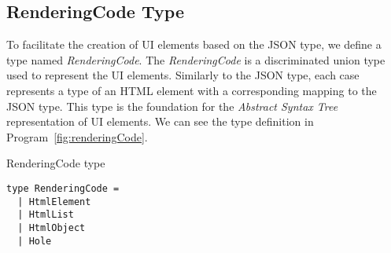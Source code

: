 \subsection{RenderingCode Type}
To facilitate the creation of UI elements based on the JSON type, we define a type named \emph{RenderingCode}.
The \emph{RenderingCode} is a discriminated union type used to represent the UI elements.
Similarly to the JSON type, each case represents a type of an HTML element with a corresponding mapping to the JSON type.
This type is the foundation for the \emph{Abstract Syntax Tree} representation of UI elements.
We can see the type definition in Program~\ref{fig:renderingCode}.
\begin{listing}[htbp]
	\caption {RenderingCode type}
	\label{fig:renderingCode}
	\begin{lstlisting}
type RenderingCode =
  | HtmlElement 
  | HtmlList 
  | HtmlObject 
  | Hole 
  \end{lstlisting}
\end{listing}

